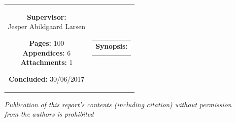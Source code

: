 \begin{nopagebreak}
{\begin{tabular}{cc}
{{\textbf{Supervisor:}\\Jesper Abildgaard Larsen\\
}

\textbf{Pages:} 100\\
\textbf{Appendices:} 6 \\
\textbf{Attachments:} 1 \\

\textbf{Concluded:} 30/06/2017\\

\vfill } &
\parbox{7cm}{
  \vspace{.15cm}
  \hfill
  \begin{tabular}{l}
  {\textbf{Synopsis:}} \\
  \fbox{
    \parbox{6.5cm}{\bigskip
     {\vfill{\small 
     \bigskip}}
     }}
   \end{tabular}}
\end{tabular} %
}


\textit{\phantom{A}Publication of this report's contents (including citation) without permission\\ \phantom{A}from the authors is prohibited}\\

\end{nopagebreak}
%